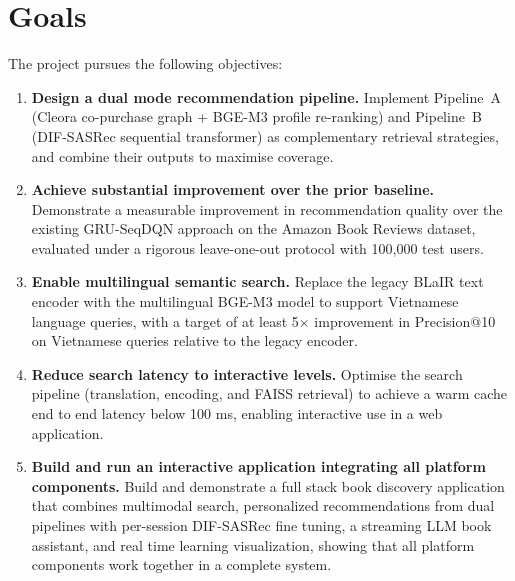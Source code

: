 \section{Goals}
\label{sec:goals}

The project pursues the following objectives:

\begin{enumerate}
    \item \textbf{Design a dual mode recommendation pipeline.}
    Implement Pipeline~A (Cleora co-purchase graph + BGE-M3 profile re-ranking) and Pipeline~B (DIF-SASRec sequential transformer) as complementary retrieval strategies, and combine their outputs to maximise coverage.

    \item \textbf{Achieve substantial improvement over the prior baseline.}
    Demonstrate a measurable improvement in recommendation quality over the existing GRU-SeqDQN approach on the Amazon Book Reviews dataset, evaluated under a rigorous leave-one-out protocol with 100{,}000 test users.

    \item \textbf{Enable multilingual semantic search.}
    Replace the legacy BLaIR text encoder with the multilingual BGE-M3 model to support Vietnamese language queries, with a target of at least 5$\times$ improvement in Precision@10 on Vietnamese queries relative to the legacy encoder.

    \item \textbf{Reduce search latency to interactive levels.}
    Optimise the search pipeline (translation, encoding, and FAISS retrieval) to achieve a warm cache end to end latency below 100 ms, enabling interactive use in a web application.

    \item \textbf{Build and run an interactive application integrating all platform components.}
    Build and demonstrate a full stack book discovery application that combines multimodal search, personalized recommendations from dual pipelines with per-session DIF-SASRec fine tuning, a streaming LLM book assistant, and real time learning visualization, showing that all platform components work together in a complete system.
\end{enumerate}

